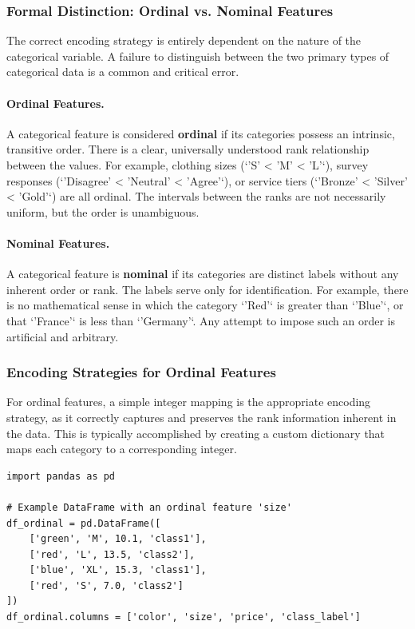 \begin{itemize}
\subsubsection{Formal Distinction: Ordinal vs. Nominal Features}
The correct encoding strategy is entirely dependent on the nature of the categorical variable. A failure to distinguish between the two primary types of categorical data is a common and critical error.

\paragraph{Ordinal Features.} A categorical feature is considered \textbf{ordinal} if its categories possess an intrinsic, transitive order. There is a clear, universally understood rank relationship between the values. For example, clothing sizes (`'S' < 'M' < 'L'`), survey responses (`'Disagree' < 'Neutral' < 'Agree'`), or service tiers (`'Bronze' < 'Silver' < 'Gold'`) are all ordinal. The intervals between the ranks are not necessarily uniform, but the order is unambiguous.

\paragraph{Nominal Features.} A categorical feature is \textbf{nominal} if its categories are distinct labels without any inherent order or rank. The labels serve only for identification. For example, there is no mathematical sense in which the category `'Red'` is greater than `'Blue'`, or that `'France'` is less than `'Germany'`. Any attempt to impose such an order is artificial and arbitrary.

\subsubsection{Encoding Strategies for Ordinal Features}
For ordinal features, a simple integer mapping is the appropriate encoding strategy, as it correctly captures and preserves the rank information inherent in the data. This is typically accomplished by creating a custom dictionary that maps each category to a corresponding integer.

\begin{verbatim}
import pandas as pd

# Example DataFrame with an ordinal feature 'size'
df_ordinal = pd.DataFrame([
    ['green', 'M', 10.1, 'class1'],
    ['red', 'L', 13.5, 'class2'],
    ['blue', 'XL', 15.3, 'class1'],
    ['red', 'S', 7.0, 'class2']
])
df_ordinal.columns = ['color', 'size', 'price', 'class_label']


\end{verbatim}
\end{itemize}

